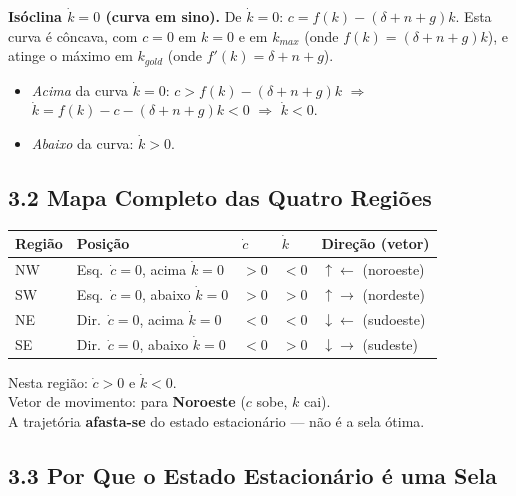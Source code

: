\documentclass[12pt, a4paper]{article}
\begin{document}
\textbf{Isóclina $\dot{k}=0$ (curva em sino).} De $\dot{k}=0$: $c = f(k)-(\delta+n+g)k$. Esta curva é côncava, com $c=0$ em $k=0$ e em $k_{max}$ (onde $f(k)=(\delta+n+g)k$), e atinge o máximo em $k_{gold}$ (onde $f'(k)=\delta+n+g$).

\begin{itemize}
\item \emph{Acima} da curva $\dot{k}=0$: $c > f(k)-(\delta+n+g)k$ $\Rightarrow$ $\dot{k} = f(k)-c-(\delta+n+g)k < 0$ $\Rightarrow$ \textbf{$\dot{k}<0$}.
\item \emph{Abaixo} da curva: \textbf{$\dot{k}>0$}.
\end{itemize}

\subsection*{3.2 Mapa Completo das Quatro Regiões}

\begin{center}
\begin{tabular}{lllll}
\toprule
Região & Posição & $\dot{c}$ & $\dot{k}$ & Direção (vetor) \\
\midrule
NW & Esq.\ $\dot{c}=0$, acima $\dot{k}=0$ & $>0$ & $<0$ & $\uparrow\leftarrow$ (noroeste) \\
SW & Esq.\ $\dot{c}=0$, abaixo $\dot{k}=0$ & $>0$ & $>0$ & $\uparrow\rightarrow$ (nordeste) \\
NE & Dir.\ $\dot{c}=0$, acima $\dot{k}=0$ & $<0$ & $<0$ & $\downarrow\leftarrow$ (sudoeste) \\
SE & Dir.\ $\dot{c}=0$, abaixo $\dot{k}=0$ & $<0$ & $>0$ & $\downarrow\rightarrow$ (sudeste) \\
\bottomrule
\end{tabular}
\end{center}

\begin{resultbox}[title={Resposta da Q3 --- Região NW (esq.\ de $\dot{c}=0$, acima de $\dot{k}=0$)}]
Nesta região: $\dot{c}>0$ e $\dot{k}<0$.\\
Vetor de movimento: para \textbf{Noroeste} ($c$ sobe, $k$ cai).\\
A trajetória \textbf{afasta-se} do estado estacionário --- não é a sela ótima.
\end{resultbox}

\subsection*{3.3 Por Que o Estado Estacionário é uma Sela}
\end{document}
